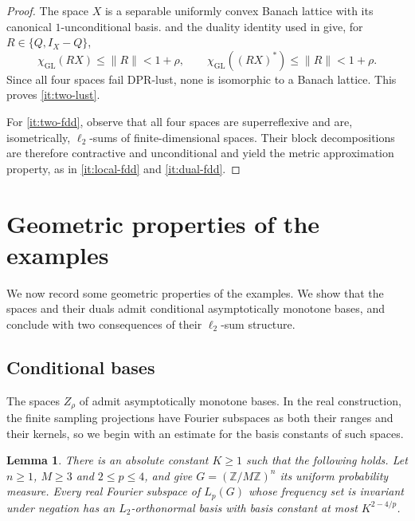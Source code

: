 \documentclass[11pt,a4paper,reqno]{amsart}
\newtheorem{lemma}[lemma]{Lemma}
\theoremstyle{definition}
\newcommand{\norm}[1]{\lVert #1\rVert}
\numberwithin{equation}{section}
\begin{document}
\begin{proof}
The space $X$ is a separable uniformly convex Banach lattice with its canonical $1$-unconditional basis.  and the duality identity used in  give, for $R\in\{Q,I_X-Q\}$,
\begin{equation*}
 \chi_{\mathrm{GL}}(RX)\leq\norm R<1+\rho,\qquad
 \chi_{\mathrm{GL}}((RX)^*)\leq\norm R<1+\rho.
\end{equation*}
Since all four spaces fail DPR-lust, none is isomorphic to a Banach lattice. This proves \ref{it:two-lust}.

For \ref{it:two-fdd}, observe that all four spaces are superreflexive and are, isometrically, $\ell_2$-sums of finite-dimensional spaces. Their block decompositions are therefore contractive and unconditional and yield the metric approximation property, as in \ref{it:local-fdd} and \ref{it:dual-fdd}.
\end{proof}
\section{Geometric properties of the examples}\label{sec:geometry}

We now record some geometric properties of the examples. We show that the spaces and their duals admit conditional asymptotically monotone bases, and conclude with two consequences of their $\ell_2$-sum structure.

\subsection{Conditional bases}\label{sec:schauder}

The spaces $Z_\rho$ of  admit asymptotically monotone bases. In the real construction, the finite sampling projections have Fourier subspaces as both their ranges and their kernels, so we begin with an estimate for the basis constants of such spaces.

\begin{lemma}\label{lem:finite-fourier-bases}
There is an absolute constant $K\geq1$ such that the following holds. Let $n\geq1$, $M\geq3$ and $2\leq p\leq4$, and give $G=(\mathbb Z/M\mathbb Z)^n$ its uniform probability measure. Every real Fourier subspace of $L_p(G)$ whose frequency set is invariant under negation has an $L_2$-orthonormal basis with basis constant at most $K^{2-4/p}$.
\end{lemma}
\end{document}
